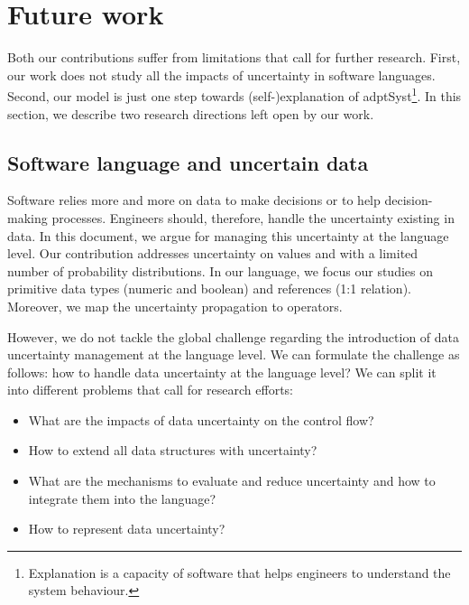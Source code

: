 \section{Future work}

Both our contributions suffer from limitations that call for further research.
First, our work does not study all the impacts of uncertainty in software languages.
Second, our model is just one step towards (self-)explanation of \gls{adptSyst}\footnote{Explanation is a capacity of software that helps engineers to understand the system behaviour.}.
In this section, we describe two research directions left open by our work.

\subsection{Software language and uncertain data}
Software relies more and more on data to make decisions or to help decision-making processes.
Engineers should, therefore, handle the uncertainty existing in data.
In this document, we argue for managing this uncertainty at the language level.
Our contribution addresses uncertainty on values and with a limited number of probability distributions.
In our language, we focus our studies on primitive data types (numeric and boolean) and references (1:1 relation).
Moreover, we map the uncertainty propagation to operators.

However, we do not tackle the global challenge regarding the introduction of data uncertainty management at the language level.
We can formulate the challenge as follows: how to handle data uncertainty at the language level?
We can split it into different problems that call for research efforts:
\begin{itemize}
	\item What are the impacts of data uncertainty on the control flow?
	\item How to extend all data structures with uncertainty?
	\item What are the mechanisms to evaluate and reduce uncertainty and how to integrate them into the language?
	\item How to represent data uncertainty?
\end{itemize}

